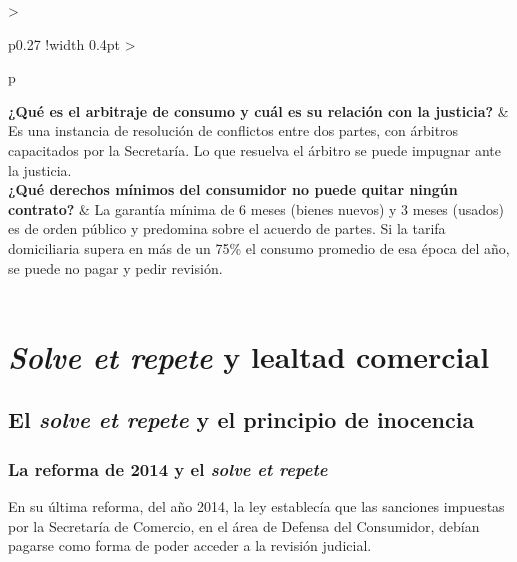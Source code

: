 \documentclass[12pt,oneside]{book}
\begin{document}
\begin{longtable}{
    >{\raggedright\arraybackslash}p{}
    !{\vrule width 0.4pt}
    >{\raggedright\arraybackslash}p{\tabcolsep-0.4pt\relax}
}
\textbf{¿Qué es el arbitraje de consumo y cuál es su relación con la justicia?} &
Es una instancia de resolución de conflictos entre dos partes, con árbitros capacitados por la Secretaría. Lo que resuelva el árbitro se puede impugnar ante la justicia. \\[0.6em]

\textbf{¿Qué derechos mínimos del consumidor no puede quitar ningún contrato?} &
La garantía mínima de 6 meses (bienes nuevos) y 3 meses (usados) es de orden público y predomina sobre el acuerdo de partes. Si la tarifa domiciliaria supera en más de un 75\% el consumo promedio de esa época del año, se puede no pagar y pedir revisión. \\

\midrule
{} \\
\end{longtable}

\chapter[Solve et repete y lealtad comercial]{\textit{Solve et repete} y lealtad comercial}

\section{El \textit{solve et repete} y el principio de inocencia}

\subsection{La reforma de 2014 y el \textit{solve et repete}}

En su última reforma, del año 2014, la ley establecía que las sanciones impuestas por la Secretaría de Comercio, en el área de Defensa del Consumidor, debían pagarse como forma de poder acceder a la revisión judicial.
\end{document}
